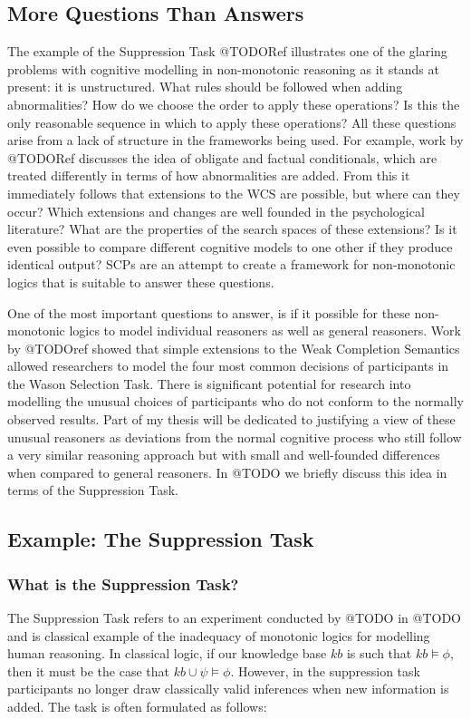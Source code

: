 \documentclass{article}
\begin{document}
\subsection{More Questions Than Answers}
The example of the Suppression Task @TODORef illustrates one of the glaring problems with cognitive modelling in non-monotonic reasoning as it stands at present: it is unstructured. What rules should be followed when adding abnormalities? How do we choose the order to apply these operations? Is this the only reasonable sequence in which to apply these operations? All these questions arise from a lack of structure in the frameworks being used. For example, work by @TODORef discusses the idea of obligate and factual conditionals, which are treated differently in terms of how abnormalities are added. From this it immediately follows that extensions to the WCS are possible, but where can they occur? Which extensions and changes are well founded in the psychological literature? What are the properties of the search spaces of these extensions? Is it even possible to compare different cognitive models to one other if they produce identical output? SCPs are an attempt to create a framework for non-monotonic logics that is suitable to answer these questions.

One of the most important questions to answer, is if it possible for these non-monotonic logics to model individual reasoners as well as general reasoners. Work by @TODOref showed that simple extensions to the Weak Completion Semantics allowed researchers to model the four most common decisions of participants in the Wason Selection Task. There is significant potential for research into modelling the unusual choices of participants who do not conform to the normally observed results. Part of my thesis will be dedicated to justifying a view of these unusual reasoners as deviations from the normal cognitive process who still follow a very similar reasoning approach but with small and well-founded differences when compared to general reasoners. In @TODO we briefly discuss this idea in terms of the Suppression Task.

\subsection{Example: The Suppression Task}
\subsubsection{What is the Suppression Task?}
The Suppression Task refers to an experiment conducted by @TODO in @TODO and is classical example of the inadequacy of monotonic logics for modelling human reasoning. In classical logic, if our knowledge base $kb$ is such that $kb \models \phi$, then it must be the case that $kb \cup \psi \models \phi$. However, in the suppression task participants no longer draw classically valid inferences when new information is added. The task is often formulated as follows:
\end{document}
